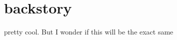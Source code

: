 \chapter{\Name{} backstory}
\label{background}

 pretty cool. But I wonder if this will be the exact same